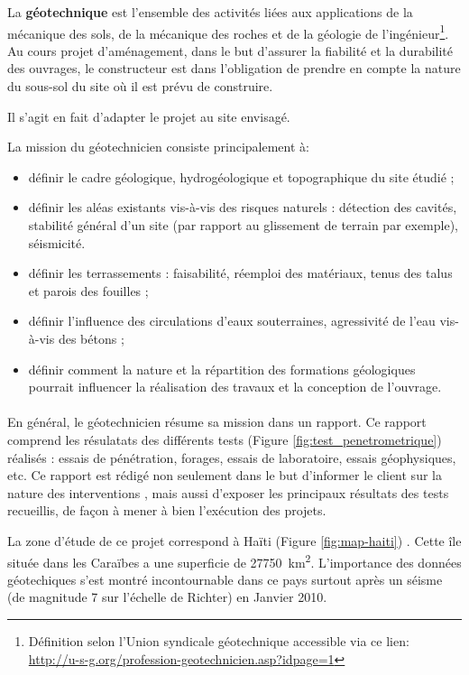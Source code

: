 \par 
La \textbf{géotechnique} est l’ensemble des 
activités liées aux applications de la mécanique des sols, de la mécanique 
des roches et de la géologie de l’ingénieur\footnote{
    Définition selon l’Union syndicale géotechnique accessible via ce lien: 
    \url{http://u-s-g.org/profession-geotechnicien.asp?idpage=1}}.
Au cours projet d'aménagement, dans le but d'assurer  la fiabilité et la durabilité
des ouvrages, le constructeur est dans l'obligation de prendre en compte
la nature du sous-sol du site où il est prévu de construire.

Il s'agit en fait d'adapter le projet au site envisagé.
\par
La mission du géotechnicien consiste principalement à:
\begin{itemize}
    \item définir le cadre géologique, hydrogéologique et topographique 
    du site étudié ;
    \item définir les aléas existants vis-à-vis des risques naturels : 
    détection des cavités, stabilité général d’un site (par rapport au 
    glissement de terrain par exemple), séismicité.
    \item définir les terrassements : faisabilité, réemploi des matériaux, 
    tenus des talus et parois des fouilles ;
    \item définir l’influence des circulations d’eaux souterraines, 
    agressivité de l’eau vis-à-vis des bétons ;
    \item définir comment la nature et la répartition des 
    formations géologiques pourrait influencer la réalisation des travaux et la conception 
    de l’ouvrage.
\end{itemize}
\paragraph{}
En général, le géotechnicien résume sa mission dans un rapport.
Ce rapport comprend les résulatats des différents tests (Figure \ref{fig:test_penetrometrique}) réalisés : essais de pénétration, forages, essais de laboratoire,
essais géophysiques, etc.
Ce rapport est rédigé non seulement dans le but d’informer le client sur la nature des interventions
, mais aussi d’exposer les principaux résultats des tests recueillis, de façon à mener à bien
l’exécution des projets.
\par
La zone d'étude de ce projet correspond à Haïti (Figure \ref{fig:map-haiti}) .
Cette île située dans les Caraïbes a une superficie de  \SI{27750}{\kilo\metre\squared}.
L'importance des données géotechiques s'est montré incontournable dans ce pays surtout 
après un séisme (de magnitude 7 sur l'échelle de Richter) en Janvier 2010.

